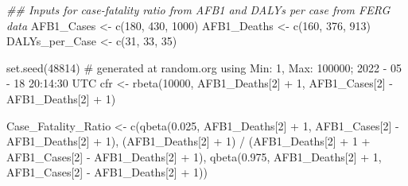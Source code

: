\documentclass[
  letterpaper,
  DIV=11,
  numbers=noendperiod]{scrartcl}
\newenvironment{Shaded}{\begin{snugshade}}{\end{snugshade}}
\newcommand{\CommentTok}[1]{\textcolor[rgb]{0.37,0.37,0.37}{#1}}
\newcommand{\DecValTok}[1]{\textcolor[rgb]{0.68,0.00,0.00}{#1}}
\newcommand{\DocumentationTok}[1]{\textcolor[rgb]{0.37,0.37,0.37}{\textit{#1}}}
\newcommand{\FloatTok}[1]{\textcolor[rgb]{0.68,0.00,0.00}{#1}}
\newcommand{\FunctionTok}[1]{\textcolor[rgb]{0.28,0.35,0.67}{#1}}
\newcommand{\NormalTok}[1]{\textcolor[rgb]{0.00,0.23,0.31}{#1}}
\newcommand{\OtherTok}[1]{\textcolor[rgb]{0.00,0.23,0.31}{#1}}
\newcommand{\SpecialCharTok}[1]{\textcolor[rgb]{0.37,0.37,0.37}{#1}}
\begin{document}
\begin{Shaded}
\begin{Highlighting}[]
\DocumentationTok{\#\# Inputs for case{-}fatality ratio from AFB1 and DALYs per case from FERG data}
\NormalTok{AFB1\_Cases }\OtherTok{\textless{}{-}} \FunctionTok{c}\NormalTok{(}\DecValTok{180}\NormalTok{,  }\DecValTok{430}\NormalTok{,  }\DecValTok{1000}\NormalTok{)}
\NormalTok{AFB1\_Deaths }\OtherTok{\textless{}{-}} \FunctionTok{c}\NormalTok{(}\DecValTok{160}\NormalTok{, }\DecValTok{376}\NormalTok{, }\DecValTok{913}\NormalTok{)}
\NormalTok{DALYs\_per\_Case }\OtherTok{\textless{}{-}} \FunctionTok{c}\NormalTok{(}\DecValTok{31}\NormalTok{, }\DecValTok{33}\NormalTok{, }\DecValTok{35}\NormalTok{)}


\FunctionTok{set.seed}\NormalTok{(}\DecValTok{48814}\NormalTok{) }\CommentTok{\# generated at random.org using Min: 1,  Max: 100000; 2022 {-} 05 {-} 18 20:14:30 UTC}
\NormalTok{cfr }\OtherTok{\textless{}{-}} \FunctionTok{rbeta}\NormalTok{(}\DecValTok{10000}\NormalTok{, AFB1\_Deaths[}\DecValTok{2}\NormalTok{] }\SpecialCharTok{+} \DecValTok{1}\NormalTok{, AFB1\_Cases[}\DecValTok{2}\NormalTok{] }\SpecialCharTok{{-}}\NormalTok{ AFB1\_Deaths[}\DecValTok{2}\NormalTok{] }\SpecialCharTok{+} \DecValTok{1}\NormalTok{)}

\NormalTok{Case\_Fatality\_Ratio }\OtherTok{\textless{}{-}} \FunctionTok{c}\NormalTok{(}\FunctionTok{qbeta}\NormalTok{(}\FloatTok{0.025}\NormalTok{,  AFB1\_Deaths[}\DecValTok{2}\NormalTok{] }\SpecialCharTok{+} \DecValTok{1}\NormalTok{,  AFB1\_Cases[}\DecValTok{2}\NormalTok{] }\SpecialCharTok{{-}}\NormalTok{ AFB1\_Deaths[}\DecValTok{2}\NormalTok{] }\SpecialCharTok{+} \DecValTok{1}\NormalTok{), }
\NormalTok{       (AFB1\_Deaths[}\DecValTok{2}\NormalTok{] }\SpecialCharTok{+} \DecValTok{1}\NormalTok{)  }\SpecialCharTok{/}\NormalTok{  (AFB1\_Deaths[}\DecValTok{2}\NormalTok{] }\SpecialCharTok{+} \DecValTok{1} \SpecialCharTok{+}\NormalTok{ AFB1\_Cases[}\DecValTok{2}\NormalTok{] }\SpecialCharTok{{-}}\NormalTok{ AFB1\_Deaths[}\DecValTok{2}\NormalTok{] }\SpecialCharTok{+} \DecValTok{1}\NormalTok{), }
       \FunctionTok{qbeta}\NormalTok{(}\FloatTok{0.975}\NormalTok{,  AFB1\_Deaths[}\DecValTok{2}\NormalTok{] }\SpecialCharTok{+} \DecValTok{1}\NormalTok{,  AFB1\_Cases[}\DecValTok{2}\NormalTok{] }\SpecialCharTok{{-}}\NormalTok{ AFB1\_Deaths[}\DecValTok{2}\NormalTok{] }\SpecialCharTok{+} \DecValTok{1}\NormalTok{))}


\end{Highlighting}
\end{Shaded}
\end{document}
